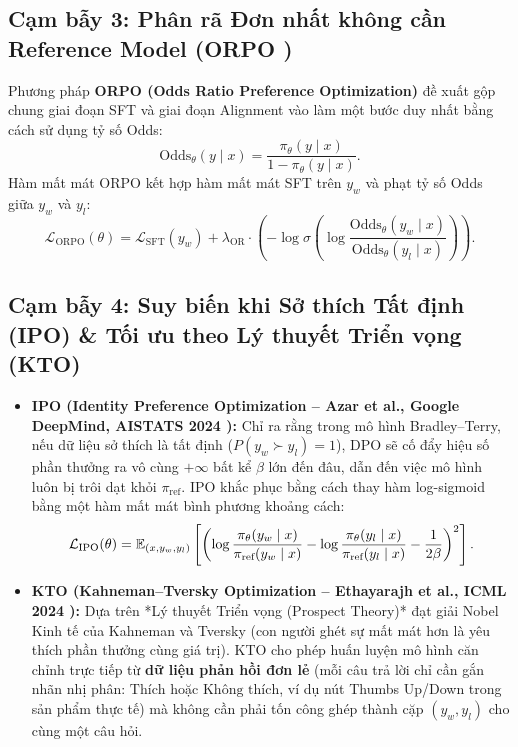 \subsection{Cạm bẫy 3: Phân rã Đơn nhất không cần Reference Model (ORPO \citealt{hong2024orpo})}
Phương pháp \textbf{ORPO (Odds Ratio Preference Optimization)} \citep{hong2024orpo} đề xuất gộp chung giai đoạn SFT và giai đoạn Alignment vào làm một bước duy nhất bằng cách sử dụng tỷ số Odds:
\begin{equation}
    \text{Odds}_\theta(y \mid x) = \frac{\pi_\theta(y \mid x)}{1 - \pi_\theta(y \mid x)}.
\end{equation}
Hàm mất mát ORPO kết hợp hàm mất mát SFT trên $y_w$ và phạt tỷ số Odds giữa $y_w$ và $y_l$:
\begin{equation}
    \mathcal{L}_{\text{ORPO}}(\theta) = \mathcal{L}_{\text{SFT}}(y_w) + \lambda_{\text{OR}} \cdot \left( -\log \sigma \left( \log \frac{\text{Odds}_\theta(y_w \mid x)}{\text{Odds}_\theta(y_l \mid x)} \right) \right).
    \label{eq:orpo_loss}
\end{equation}

\subsection{Cạm bẫy 4: Suy biến khi Sở thích Tất định (IPO) \& Tối ưu theo Lý thuyết Triển vọng (KTO)}
\begin{itemize}[leftmargin=1.2cm]
    \item \textbf{IPO (Identity Preference Optimization -- Azar et al., Google DeepMind, AISTATS 2024 \citealt{azar2024general}):} Chỉ ra rằng trong mô hình Bradley--Terry, nếu dữ liệu sở thích là tất định ($P(y_w \succ y_l) = 1$), DPO sẽ cố đẩy hiệu số phần thưởng ra vô cùng $+\infty$ bất kể $\beta$ lớn đến đâu, dẫn đến việc mô hình luôn bị trôi dạt khỏi $\pi_{\text{ref}}$. IPO khắc phục bằng cách thay hàm log-sigmoid bằng một hàm mất mát bình phương khoảng cách:
    \begin{equation}
        \mathcal{L}_{\text{IPO}}(\theta) = \operatorname{\mathbb{E}}_{(x, y_w, y_l)} \left[ \left( \log \frac{\pi_\theta(y_w \mid x)}{\pi_{\text{ref}}(y_w \mid x)} - \log \frac{\pi_\theta(y_l \mid x)}{\pi_{\text{ref}}(y_l \mid x)} - \frac{1}{2\beta} \right)^2 \right].
        \label{eq:ipo_loss}
    \end{equation}
    \item \textbf{KTO (Kahneman--Tversky Optimization -- Ethayarajh et al., ICML 2024 \citealt{ethayarajh2024kto}):} Dựa trên *Lý thuyết Triển vọng (Prospect Theory)* đạt giải Nobel Kinh tế của Kahneman và Tversky (con người ghét sự mất mát hơn là yêu thích phần thưởng cùng giá trị). KTO cho phép huấn luyện mô hình căn chỉnh trực tiếp từ \textbf{dữ liệu phản hồi đơn lẻ} (mỗi câu trả lời chỉ cần gắn nhãn nhị phân: $\text{Thích}$ hoặc $\text{Không thích}$, ví dụ nút Thumbs Up/Down trong sản phẩm thực tế) mà không cần phải tốn công ghép thành cặp $(y_w, y_l)$ cho cùng một câu hỏi.
\end{itemize}

